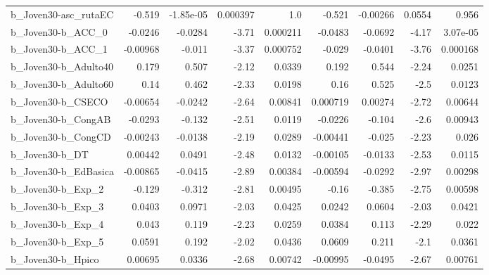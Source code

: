 \begin{tabular}{lrrrrrrrr}
b\_Joven30-asc\_rutaEC       &      -0.519 &    -1.85e-05 &  0.000397 &      1.0 &     -0.521 &    -0.00266 &       0.0554 &         0.956 \\
b\_Joven30-b\_ACC\_0          &     -0.0246 &      -0.0284 &     -3.71 & 0.000211 &    -0.0483 &     -0.0692 &        -4.17 &      3.07e-05 \\
b\_Joven30-b\_ACC\_1          &    -0.00968 &       -0.011 &     -3.37 & 0.000752 &     -0.029 &     -0.0401 &        -3.76 &      0.000168 \\
b\_Joven30-b\_Adulto40       &       0.179 &        0.507 &     -2.12 &   0.0339 &      0.192 &       0.544 &        -2.24 &        0.0251 \\
b\_Joven30-b\_Adulto60       &        0.14 &        0.462 &     -2.33 &   0.0198 &       0.16 &       0.525 &         -2.5 &        0.0123 \\
b\_Joven30-b\_CSECO          &    -0.00654 &      -0.0242 &     -2.64 &  0.00841 &   0.000719 &     0.00274 &        -2.72 &       0.00644 \\
b\_Joven30-b\_CongAB         &     -0.0293 &       -0.132 &     -2.51 &   0.0119 &    -0.0226 &      -0.104 &         -2.6 &       0.00943 \\
b\_Joven30-b\_CongCD         &    -0.00243 &      -0.0138 &     -2.19 &   0.0289 &   -0.00441 &      -0.025 &        -2.23 &         0.026 \\
b\_Joven30-b\_DT             &     0.00442 &       0.0491 &     -2.48 &   0.0132 &   -0.00105 &     -0.0133 &        -2.53 &        0.0115 \\
b\_Joven30-b\_EdBasica       &    -0.00865 &      -0.0415 &     -2.89 &  0.00384 &   -0.00594 &     -0.0292 &        -2.97 &       0.00298 \\
b\_Joven30-b\_Exp\_2          &      -0.129 &       -0.312 &     -2.81 &  0.00495 &      -0.16 &      -0.385 &        -2.75 &       0.00598 \\
b\_Joven30-b\_Exp\_3          &      0.0403 &       0.0971 &     -2.03 &   0.0425 &     0.0242 &      0.0604 &        -2.03 &        0.0421 \\
b\_Joven30-b\_Exp\_4          &       0.043 &        0.119 &     -2.23 &   0.0259 &     0.0384 &       0.113 &        -2.29 &         0.022 \\
b\_Joven30-b\_Exp\_5          &      0.0591 &        0.192 &     -2.02 &   0.0436 &     0.0609 &       0.211 &         -2.1 &        0.0361 \\
b\_Joven30-b\_Hpico          &     0.00695 &       0.0336 &     -2.68 &  0.00742 &   -0.00995 &     -0.0495 &        -2.67 &       0.00761 \\

\end{tabular}
